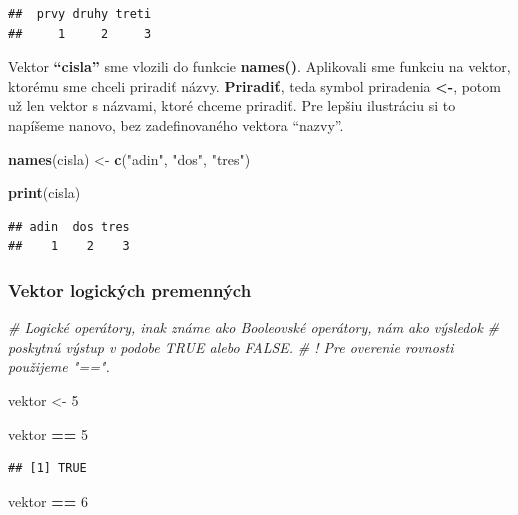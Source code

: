 \documentclass[]{article}
\newenvironment{Shaded}{\begin{snugshade}}{\end{snugshade}}
\newcommand{\CommentTok}[1]{\textcolor[rgb]{0.56,0.35,0.01}{\textit{#1}}}
\newcommand{\DecValTok}[1]{\textcolor[rgb]{0.00,0.00,0.81}{#1}}
\newcommand{\KeywordTok}[1]{\textcolor[rgb]{0.13,0.29,0.53}{\textbf{#1}}}
\newcommand{\NormalTok}[1]{#1}
\newcommand{\OperatorTok}[1]{\textcolor[rgb]{0.81,0.36,0.00}{\textbf{#1}}}
\newcommand{\StringTok}[1]{\textcolor[rgb]{0.31,0.60,0.02}{#1}}
\begin{document}
\begin{verbatim}
##  prvy druhy treti 
##     1     2     3
\end{verbatim}

Vektor \textbf{``cisla''} sme vlozili do funkcie \textbf{names()}.
Aplikovali sme funkciu na vektor, ktorému sme chceli priradiť názvy.
\textbf{Priradiť}, teda symbol priradenia \textbf{\textless-}, potom už
len vektor s názvami, ktoré chceme priradiť. Pre lepšiu ilustráciu si to
napíšeme nanovo, bez zadefinovaného vektora ``nazvy''.

\begin{Shaded}
\begin{Highlighting}[]
\KeywordTok{names}\NormalTok{(cisla) <-}\StringTok{ }\KeywordTok{c}\NormalTok{(}\StringTok{"adin"}\NormalTok{, }\StringTok{"dos"}\NormalTok{, }\StringTok{"tres"}\NormalTok{)}

\KeywordTok{print}\NormalTok{(cisla)}
\end{Highlighting}
\end{Shaded}

\begin{verbatim}
## adin  dos tres 
##    1    2    3
\end{verbatim}

\newpage

\hypertarget{vektor-logickuxfdch-premennuxfdch}{%
\subsubsection{Vektor logických
premenných}\label{vektor-logickuxfdch-premennuxfdch}}

\begin{Shaded}
\begin{Highlighting}[]
\CommentTok{# Logické operátory, inak známe ako Booleovské operátory, nám ako výsledok}
\CommentTok{# poskytnú výstup v podobe TRUE alebo FALSE.}
\CommentTok{# ! Pre overenie rovnosti použijeme "==".}

\NormalTok{vektor <-}\StringTok{  }\DecValTok{5}

\NormalTok{vektor }\OperatorTok{==}\StringTok{ }\DecValTok{5}
\end{Highlighting}
\end{Shaded}

\begin{verbatim}
## [1] TRUE
\end{verbatim}

\begin{Shaded}
\begin{Highlighting}[]
\NormalTok{vektor }\OperatorTok{==}\StringTok{ }\DecValTok{6}
\end{Highlighting}
\end{Shaded}
\end{document}
